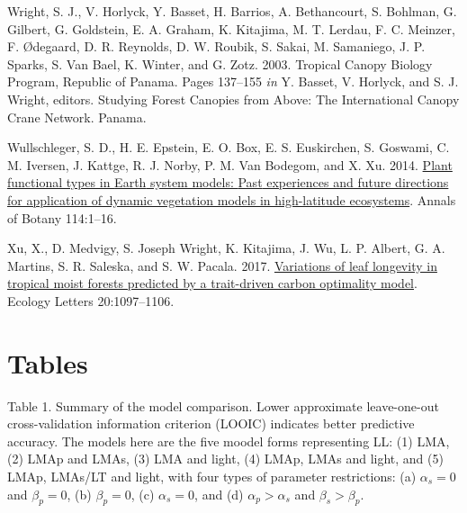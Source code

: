 \documentclass[
  12pt,
  a4paper,
,tablecaptionabove
]{scrartcl}
\newlength{\cslhangindent}
\newenvironment{CSLReferences}[2] %
 {%
  \setlength{\parindent}{0pt}
  \ifodd #1 \everypar{\setlength{\hangindent}{\cslhangindent}}\ignorespaces\fi
  \ifnum #2 > 0
  \setlength{\parskip}{#2\baselineskip}
  \fi
 }%
 {}
\begin{document}
\begin{CSLReferences}{1}{0}
\leavevmode{}%
Wright, S. J., V. Horlyck, Y. Basset, H. Barrios, A. Bethancourt, S.
Bohlman, G. Gilbert, G. Goldstein, E. A. Graham, K. Kitajima, M. T.
Lerdau, F. C. Meinzer, F. Ødegaard, D. R. Reynolds, D. W. Roubik, S.
Sakai, M. Samaniego, J. P. Sparks, S. Van Bael, K. Winter, and G. Zotz.
2003. Tropical {Canopy Biology Program}, {Republic} of {Panama}. Pages
137--155 \emph{in} Y. Basset, V. Horlyck, and S. J. Wright, editors.
Studying {Forest Canopies} from {Above}: {The International Canopy Crane
Network}. {Panama}.

\leavevmode{}%
Wullschleger, S. D., H. E. Epstein, E. O. Box, E. S. Euskirchen, S.
Goswami, C. M. Iversen, J. Kattge, R. J. Norby, P. M. Van Bodegom, and
X. Xu. 2014. \href{https://doi.org/10.1093/aob/mcu077}{Plant functional
types in {Earth} system models: {Past} experiences and future directions
for application of dynamic vegetation models in high-latitude
ecosystems}. Annals of Botany 114:1--16.

\leavevmode{}%
Xu, X., D. Medvigy, S. Joseph Wright, K. Kitajima, J. Wu, L. P. Albert,
G. A. Martins, S. R. Saleska, and S. W. Pacala. 2017.
\href{https://doi.org/10.1111/ele.12804}{Variations of leaf longevity in
tropical moist forests predicted by a trait-driven carbon optimality
model}. Ecology Letters 20:1097--1106.

\end{CSLReferences}

\newpage

\hypertarget{tables}{%
\section{Tables}\label{tables}}

Table 1. Summary of the model comparison. Lower approximate
leave-one-out cross-validation information criterion (LOOIC) indicates
better predictive accuracy. The models here are the five moodel forms
representing LL: (1) LMA, (2) LMAp and LMAs, (3) LMA and light, (4)
LMAp, LMAs and light, and (5) LMAp, LMAs/LT and light, with four types
of parameter restrictions: (a) \(\alpha_s = 0\) and \(\beta_p = 0\), (b)
\(\beta_p = 0\), (c) \(\alpha_s = 0\), and (d) \(\alpha_p > \alpha_s\)
and \(\beta_s > \beta_p\).
\end{document}
